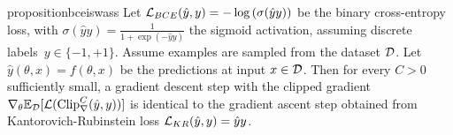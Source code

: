     \begin{restatable}{proposition}{bceiswass}\label{prop:bceiswass}
    Let $\mathcal{L}_{BCE}(\hat y,y)=-\log{(\sigma(\hat yy))}$ be the binary cross-entropy loss, with $\sigma(\hat yy)=\frac{1}{1+\exp{(-\hat yy)}}$ the sigmoid activation, assuming discrete labels~${y\in\{-1,+1\}}$. Assume examples are sampled from the dataset $\mathcal{D}$. Let $\hat y(\theta, x)=f(\theta,x)$ be the predictions at input $x\in\mathcal{D}$. Then for every $C>0$ sufficiently small, a gradient descent step with the clipped gradient $\nabla_{\theta}\mathbb{E}_{\mathcal{D}}[\mathcal{L}(\text{Clip}^C_{\nabla}(\hat y,y))]$ is identical to the  
    gradient ascent step obtained from Kantorovich-Rubinstein loss $\mathcal{L}_{KR}(\hat y, y)=\hat yy$.  
    \end{restatable}
